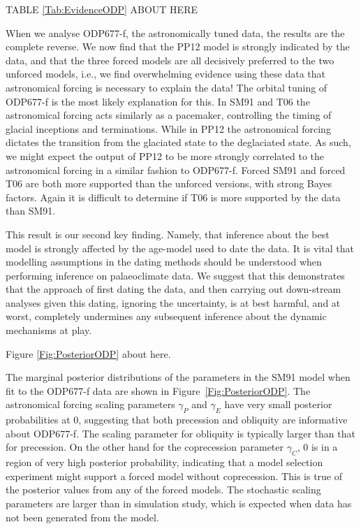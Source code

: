 \documentclass[a4paper,12pt]{article}
\begin{document}
\begin{center}
\begin{LARGE}
TABLE \ref{Tab:EvidenceODP} ABOUT HERE
\end{LARGE}
\end{center}


When we analyse ODP677-f, the astronomically tuned data, the results are the complete reverse. We now find that the PP12 model is strongly indicated by the data, and that the three forced models are all decisively preferred to the two unforced models, i.e., we find overwhelming evidence using these data that astronomical forcing is necessary to explain the data!
The orbital tuning of ODP677-f is the most likely explanation for this.
In SM91 and T06 the astronomical forcing acts similarly as a pacemaker, controlling the timing of glacial inceptions and terminations. 
While in PP12 the astronomical forcing dictates the transition from the glaciated state to the deglaciated state.
As such, we might expect the output of PP12 to be more strongly correlated to the astronomical forcing in a similar fashion to ODP677-f.
Forced SM91 and forced T06 are both more supported than the unforced versions, with strong Bayes factors.
Again it is difficult to determine if T06 is more supported by the data than SM91.


This result is our second key finding. Namely, that inference about the best model is strongly affected by the age-model used to date the data. It is vital that modelling assumptions in the dating methods should be understood when performing inference on palaeoclimate data. We suggest that this demonstrates that the approach of first dating the data, and then carrying out down-stream analyses given this dating, ignoring the uncertainty, is at best harmful, and at worst, completely undermines any subsequent inference about the dynamic mechanisms at play.


\begin{center}
\begin{LARGE}
Figure \ref{Fig:PosteriorODP} about here.
\end{LARGE}
\end{center}

The marginal posterior distributions of the parameters in the SM91 model when fit to the ODP677-f data are shown in Figure~\ref{Fig:PosteriorODP}.
The astronomical forcing scaling parameters $\gamma_P$ and $\gamma_E$ have very small posterior probabilities at 0, suggesting that both precession and obliquity are informative about ODP677-f.
The scaling parameter for obliquity is typically larger than that for precession.
On the other hand for the coprecession parameter $\gamma_C$, 0 is in a region of very high posterior probability, indicating that a model selection experiment might support a forced model without coprecession.
This is true of the posterior values from any of the forced models.
The stochastic scaling parameters are larger than in simulation study, which is expected when data has not been generated from the model.
\end{document}
